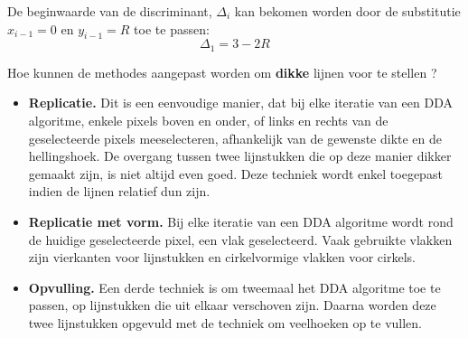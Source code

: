 \documentclass{report}
\begin{document}
\begin{enumerate}
{\begin{itemize}
			      De beginwaarde van de discriminant, $\Delta_i$ kan bekomen worden door de substitutie $x_{i - 1} = 0$ en $y_{i - 1} = R$ toe te passen:
			      $$\Delta_1 = 3 - 2R$$
			      				
		\end{itemize}
		
	}
	
			
	\vraag
	{
		Hoe kunnen de methodes aangepast worden om \textbf{dikke} lijnen voor te stellen ? 
	}
	{
		\begin{itemize}
			\item \textbf{Replicatie.} Dit is een eenvoudige manier, dat bij elke iteratie van een DDA algoritme, enkele pixels boven en onder, of links en rechts van de geselecteerde pixels meeselecteren, afhankelijk van de gewenste dikte en de hellingshoek. De overgang tussen twee lijnstukken die op deze manier dikker gemaakt zijn, is niet altijd even goed. Deze techniek wordt enkel toegepast indien de lijnen relatief dun zijn.
			\item \textbf{Replicatie met vorm.} Bij elke iteratie van een DDA algoritme wordt rond de huidige geselecteerde pixel, een vlak geselecteerd. Vaak gebruikte vlakken zijn vierkanten voor lijnstukken en cirkelvormige vlakken voor cirkels.
			      				
			\item \textbf{Opvulling.} Een derde techniek is om tweemaal het DDA algoritme toe te passen, op lijnstukken die uit elkaar verschoven zijn. Daarna worden deze twee lijnstukken opgevuld met de techniek om veelhoeken op te vullen.
		\end{itemize}
	}
\end{enumerate}
\end{document}
